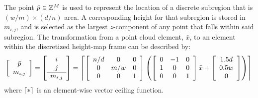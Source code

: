 			The point $\bar{p}\in{\Bbb Z}^{M}$ is used to represent the location of a discrete subregion that is $(w/m) \times (d/n)$ area. A corresponding height for that subregion is stored in $m_{i,j}$, and is selected as the largest $z$-component of any point that falls within said subregion. The transformation from a point cloud element, $\bar{x}$, to an element within the discretized height-map frame can be described by:
				\begin{equation}
					\left[
						\begin{array}{c}
						\bar{p} \\
						m_{i,j}  	\\
						\end{array}
					\right]
					=
					\left[
						\begin{array}{c}
						i \\
						j \\ \hline
						m_{i,j}  	\\
						\end{array}
					\right]
					=
					\left\lceil
						\left[
							\begin{array}{ccc}
							n/d & 0 	& 0 \\
							0 	& m/w 	& 0 \\
							0 	& 0 	& 1 \\
							\end{array}
						\right]
						\left(
							\left[
								\begin{array}{ccc}
								0 &-1 & 0 \\
								1 & 0 & 0 \\
								0 & 0 & 1 \\
								\end{array}
							\right]
							\bar{x}
							+
							\left[
								\begin{array}{c}
								1.5 d \\
								0.5 w \\
								0 \\
								\end{array}
							\right]
						\right)
					\right\rceil
					\label{eq::toheightmapframe}
				\end{equation}
			where $\left\lceil*\right\rceil$ is an element-wise vector ceiling function.

